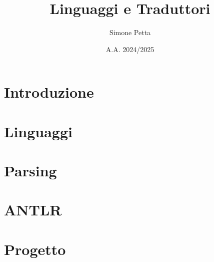 \documentclass[a4paper,12pt]{report}
\title{Linguaggi e Traduttori}
\author{Simone Petta}
\date{A.A. 2024/2025}
\begin{document}
\maketitle
\tableofcontents

\chapter{Introduzione}


\chapter{Linguaggi}


\chapter{Parsing}


\chapter{ANTLR}


\chapter{Progetto}

\end{document}
